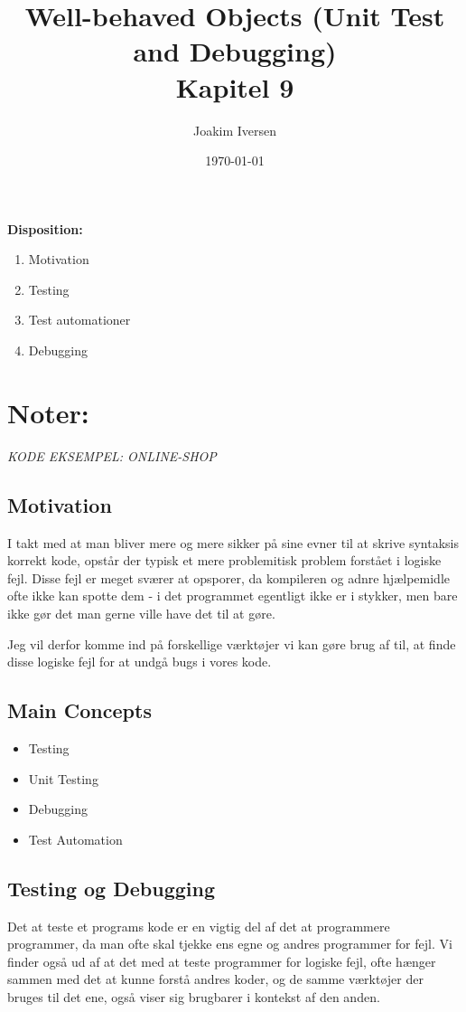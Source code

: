 \documentclass{article}
\title{Well-behaved Objects (Unit Test and Debugging) \\
        Kapitel 9}
\author{Joakim Iversen}
\date{\today}
\begin{document}
\maketitle
\newpage

\textbf{\Large Disposition:}
\begin{enumerate}
    \item Motivation
    \item Testing 
    \item Test automationer
    \item Debugging
\end{enumerate}
\newpage

\section*{Noter:}
\begin{center}
    \textit{KODE EKSEMPEL: ONLINE-SHOP}
\end{center}
\subsection*{Motivation}
I takt med at man bliver mere og mere sikker på sine evner til at skrive syntaksis korrekt kode, opstår der typisk et mere problemitisk problem forstået i logiske fejl. Disse fejl er meget sværer at opsporer, da kompileren og adnre hjælpemidle ofte ikke kan spotte dem - i det programmet egentligt ikke er i stykker, men bare ikke gør det man gerne ville have det til at gøre.

Jeg vil derfor komme ind på forskellige værktøjer vi kan gøre brug af til, at finde disse logiske fejl for at undgå bugs i vores kode.


\subsection*{Main Concepts}
\begin{itemize}
    \item Testing
    \item Unit Testing
    \item Debugging
    \item Test Automation
\end{itemize}

\subsection*{Testing og Debugging}
Det at teste et programs kode er en vigtig del af det at programmere programmer, da man ofte skal tjekke ens egne og andres programmer for fejl. Vi finder også ud af at det med at teste programmer for logiske fejl, ofte hænger sammen med det at kunne forstå andres koder, og de samme værktøjer der bruges til det ene, også viser sig brugbarer i kontekst af den anden.
\end{document}
